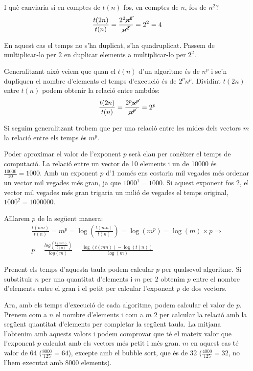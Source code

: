 I què canviaria si en comptes de $t(n)$ fos, en comptes de $n$, fos de $n^2$?
\begin{gather*}
	\frac{t(2n)}{t(n)} = \frac{2^2 \cancel{n^2}}{ \cancel{n^2}} = 2^2 = 4
\end{gather*}

En aquest cas el temps no s'ha duplicat, s'ha quadruplicat. Passem de multiplicar-lo per $2$ en duplicar elements a multiplicar-lo per $2^2$.

Generalitzant això veiem que quan el $t(n)$ d'un algoritme és de $n^p$ i se'n dupliquen el nombre d'elements el temps d'execució és de $2^p n^p$.
Dividint $t(2n)$ entre $t(n)$ podem obtenir la relació entre ambdós:
\begin{gather*}
	\frac{t(2n)}{t(n)} = \frac{2^p \cancel{n^p}}{\cancel{n^p}} = 2^p
\end{gather*}

Si seguim generalitzant trobem que per una relació entre les mides dels vectors $m$ la relació entre els temps és $m^p$.

Poder aproximar el valor de l'exponent $p$ serà clau per conèixer el temps de computació.
La relació entre un vector de 10 elements i un de 10000 és $\frac{10000}{10} = 1000$. Amb un exponent $p$ d'1 només ens costaria mil vegades més ordenar un vector mil vegades més gran, ja que $1000^1 = 1000$.
Si aquest exponent fos 2, el vector mil vegades més gran trigaria un milió de vegades el temps original, $1000^2 = 1000000$.

Aïllarem $p$ de la següent manera:
\begin{gather*}
	\frac{t(mn)}{t(n)} = m^p = \log\left(\frac{t(mn)}{t(n)}\right) = \log (m^p) = \log(m) \times p \Rightarrow \\
	p = \frac{log\left(\frac{t(mn)}{t(n)}\right)}{log(m)} = \frac{\log(t(mn))-\log(t(n))}{\log(m)}
\end{gather*}

\noindent
\makebox[\textwidth][c]{
	
}
\vspace*{1em}

Prenent els temps d'aquesta taula podem calcular $p$ per qualsevol algoritme.
Si substituir $n$ per una quantitat d'elements i $m$ per 2 obtenim $p$ entre el nombre d'elements entre el gran i el petit per calcular l'exponent $p$ de dos vectors.


Ara, amb els temps d'execució de cada algoritme, podem calcular el valor de $p$.
Prenem com a $n$ el nombre d'elements i com a $m$ 2 per calcular la relació amb la següent quantitat d'elements per completar la següent taula.
La mitjana l'obtenim amb aquests valors i podem comprovar que té el mateix valor que l'exponent $p$ calculat amb els vectors més petit i més gran. $m$ en aquest cas té valor de 64 ($\frac{8000}{125} = 64$), excepte amb el bubble sort, que és de 32 ($\frac{4000}{125} = 32$, no l'hem executat amb 8000 elements).

